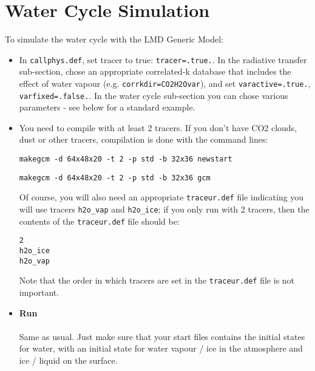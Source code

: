 \chapter{Water Cycle Simulation}

\label{sc:water}

To simulate the water cycle with the LMD Generic Model:

\begin{itemize}
\item In {\tt callphys.def}, set tracer to true: {\tt tracer=.true.}. In the radiative
transfer sub-section, chose an appropriate correlated-k database that includes the effect
of water vapour (e.g. {\tt corrkdir=CO2H2Ovar}), and set {\tt varactive=.true.}, {\tt varfixed=.false.}.
In the water cycle sub-section you can chose various parameters - see below for a standard example.



\item You need to compile with at least 2 tracers. If you don't have CO2 clouds,
dust or other tracers, compilation is done with the command lines:
\begin{verbatim}
makegcm -d 64x48x20 -t 2 -p std -b 32x36 newstart
\end{verbatim}
\begin{verbatim}
makegcm -d 64x48x20 -t 2 -p std -b 32x36 gcm
\end{verbatim}

Of course, you will also need an appropriate {\tt traceur.def} file
indicating you will use tracers {\tt h2o\_vap} and {\tt h2o\_ice};
if you only run with 2 tracers, then the contents of the {\tt traceur.def}
file should be:
\begin{verbatim}
2
h2o_ice
h2o_vap
\end{verbatim}
Note that the order in which tracers are set in the {\tt traceur.def} file
is not important.

\item {\bf Run} \\ \\
Same as usual. Just make sure that your start files contains
the initial states for water, with an initial state for water vapour / ice
in the atmosphere and ice / liquid on the surface.

\end {itemize}

